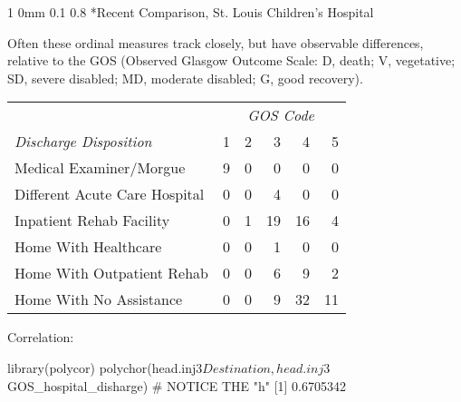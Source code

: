\documentclass[12pt]{article}
\makeatletter
\newcommand{\9}{\\[9pt]}
\renewcommand{\section}{\@startsection
	    {section}%
	    {1}%
	    {0mm}%
	    {0.1\baselineskip}%
	    {0.8\baselineskip}%
	    {\newpage \color[cmyk]{0.43,0,0.01,0} \center\LARGE}}%
\makeatother
\begin{document}
\begin{landscape}
\begin{Large}
{\section*{Recent Comparison, St. Louis Children's Hospital}
\begin{ohlist}
    \item   Often these ordinal measures track closely, but have observable differences, relative to the GOS (Observed Glasgow Outcome Scale: 
            D, death; V, vegetative; SD, severe disabled; MD, moderate disabled; G, good recovery).\\
            \begin{Large}
            \begin{center}
            \begin{tabular}{lrrrrr}
                                        & \multicolumn{5}{c}{\emph{GOS Code}} \\
            \emph{Discharge Disposition}   & 1  & 2 &  3 &  4 &  5 \\
                                        \hline
            Medical Examiner/Morgue        & 9  & 0 &  0 &  0 &  0 \\
            Different Acute Care Hospital  & 0  & 0 &  4 &  0 &  0 \\
            Inpatient Rehab Facility       & 0  & 1 & 19 & 16 &  4 \\
            Home With Healthcare           & 0  & 0 &  1 &  0 &  0 \\
            Home With Outpatient Rehab     & 0  & 0 &  6 &  9 &  2 \\
            Home With No Assistance        & 0  & 0 &  9 & 32 & 11 \\
                                        \hline
            \end{tabular}
            \end{center}
            \end{Large}
    \item   Correlation:
            \begin{VM}
library(polycor)
polychor(head.inj3$Destination, head.inj3$GOS_hospital_disharge) # NOTICE THE "h"
[1] 0.6705342
            \end{VM}
\end{ohlist}

}
\end{Large}
\end{landscape}
\end{document}

